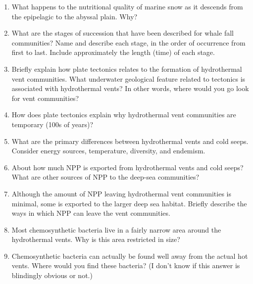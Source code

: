 \documentclass[nofonts, letterpaper]{tufte-handout}
\begin{document}
\begin{enumerate}

\item
  What happens to the nutritional quality of marine snow as it descends
  from the epipelagic to the abyssal plain. Why?

\item
  What are the stages of succession that have been described for whale
  fall communities? Name and describe each stage, in the order of
  occurrence from first to last. Include approximately the length (time) of each stage.

\item
  Briefly explain how plate tectonics relates to the formation of
  hydrothermal vent communities. What underwater geological feature
  related to tectonics is associated with hydrothermal vents? In other words,
  where would you go look for vent communities?
  
\item 
  How does plate tectonics explain why
  hydrothermal vent communities are temporary (100s of years)?
  
\item
  What are the primary differences between hydrothermal vents and cold
  seeps. Consider energy sources, temperature, diversity, and endemism.


\item
  About how much NPP is exported from hydrothermal vents and cold seeps?
  What are other sources of NPP to the deep-sea communities?

\item
  Although the amount of NPP leaving hydrothermal vent communities is
  minimal, some is exported to the larger deep sea habitat. Briefly
  describe the ways in which NPP can leave the vent communities.
  
\item
  Most chemosynthetic bacteria live in a fairly narrow area around the
  hydrothermal vents. Why is this area restricted in size?

\item
  Chemosynthetic bacteria can actually be found well away from the
  actual hot vents. Where would you find these bacteria? (I don't know
  if this answer is blindingly obvious or not.)


\end{enumerate}
\end{document}
